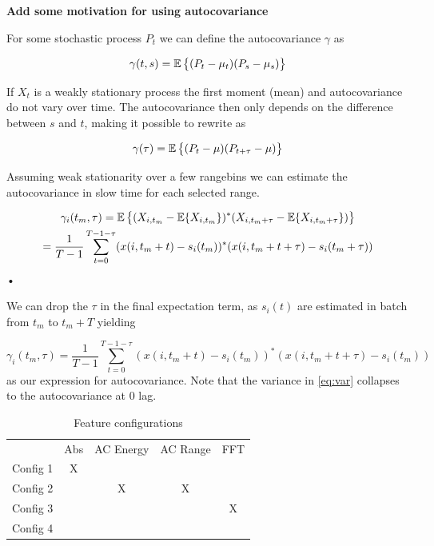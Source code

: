 \textbf{Add some motivation for using autocovariance}

\noindent
For some stochastic process $P_t$ we can define the autocovariance $\gamma$ as

\begin{equation}
	\gamma(t, s) = \operatorname*{\mathbb{E}}\big\{(P_t - \mu_t)(P_s - \mu_s)\big\}
\end{equation}

If $X_t$ is a weakly stationary process the first moment (mean) and autocovariance do not vary over time.  The autocovariance then only depends on the difference between $s$ and $t$, making it possible to rewrite as

\begin{equation}
	\gamma(\tau) = \operatorname*{\mathbb{E}}\big\{(P_t - \mu)(P_{t+\tau} - \mu)\big\}
\end{equation}

Assuming weak stationarity over a few rangebins we can estimate the autocovariance in slow time for each selected range. 

\begin{equation}
\begin{gathered}
	\gamma_i(t_m, \tau) = \operatorname*{\mathbb{E}}\big\{(X_{i,t_m} - \operatorname*{\mathbb{E}}\{X_{i, t_m}\})^*(X_{i, t_m+\tau} - \operatorname*{\mathbb{E}}\{X_{i, t_m+\tau}\})\big\}\\
	= \frac{1}{T-1}\sum_{t=0}^{T-1-\tau}(x(i, t_m + t) - s_i(t_m))^*(x(i, t_m + t + \tau) - s_i(t_m + \tau))
\end{gathered}
\end{equation}•

We can drop the $\tau$ in the final expectation term, as $s_i(t)$ are estimated in batch from $t_m$ to  $t_m + T$ yielding

\begin{equation}
	\gamma_i(t_m, \tau) = \frac{1}{T-1}\sum_{t=0}^{T-1- \tau}(x(i, t_m + t) - s_i(t_m))^*(x(i, t_m + t + \tau) - s_i(t_m))
\end{equation}
as our expression for autocovariance. Note that the variance in \ref{eq:var} collapses to the autocovariance at 0 lag. 


\begin{table}
\begin{center}
  \begin{tabular}{|c|cccc|}
\hline
    \rowcolor{blue!35}
                  & Abs & AC Energy & AC Range & FFT\\
    Config 1 & X & & & \\
    Config 2 &  & X & X&\\
    Config 3 & & & &X\\
    Config 4 & & & &\\
\hline
  \end{tabular}
\end{center}
\caption{Feature configurations}
\end{table}

